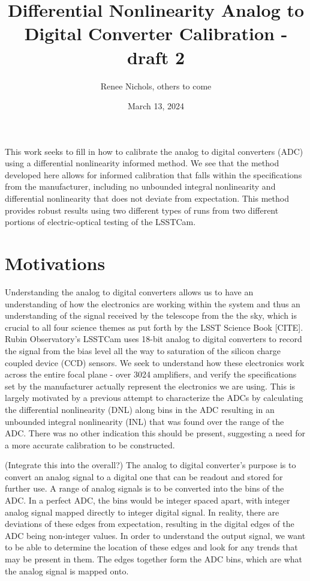 \documentclass[11pt, letterpaper]{article}
\title{Differential Nonlinearity Analog to Digital Converter Calibration - draft 2}
\author{Renee Nichols, others to come}
\date{March 13, 2024}
\begin{document}


\maketitle 

This work seeks to fill in how to calibrate the analog to digital converters (ADC) using a differential nonlinearity informed method. We see that the method developed here allows for informed calibration that falls within the specifications from the manufacturer, including no unbounded integral nonlinearity and differential nonlinearity that does not deviate from expectation. This method provides robust results using two different types of runs from two different portions of electric-optical testing of the LSSTCam. 

\section{Motivations}
\indent

 
Understanding the analog to digital converters allows us to have an understanding of how the electronics are working within the system and thus an understanding of the signal received by the telescope from the the sky, which is crucial to all four science themes as put forth by the LSST Science Book [CITE]. 
Rubin Observatory’s LSSTCam uses 18-bit analog to digital converters to record the signal from the bias level all the way to saturation of the silicon charge coupled device (CCD) sensors. 
We seek to understand how these electronics work across the entire focal plane - over 3024 amplifiers, and verify the specifications set by the manufacturer actually represent the electronics we are using. 
This is largely motivated by a previous attempt to characterize the ADCs by calculating the differential nonlinearity (DNL) along bins in the ADC resulting in an unbounded integral nonlinearity (INL) that was found over the range of the ADC. 
There was no other indication this should be present, suggesting a need for a more accurate calibration to be constructed. 

(Integrate this into the overall?) 
The analog to digital converter’s purpose is to convert an analog signal to a digital one that can be readout and stored for further use. 
A range of analog signals is to be converted into the bins of the ADC. In a perfect ADC, the bins would be integer spaced apart, with integer analog signal mapped directly to integer digital signal.
In reality, there are deviations of these edges from expectation, resulting in the digital edges of the ADC being non-integer values. In order to understand the output signal, we want to be able to determine the location of these edges and look for any trends that may be present in them. 
The edges together form the ADC bins, which are what the analog signal is mapped onto. 
\end{document}
